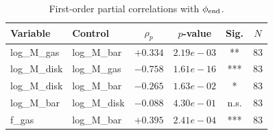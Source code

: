 \begin{table}[htbp]
\centering
\caption{First-order partial correlations with $\phi_{\rm end}$.}
\label{tab:partials}
\begin{tabular}{llcccc}
\hline
Variable & Control & $\rho_p$ & $p$-value & Sig. & $N$ \\
\hline
log\_M\_gas & log\_M\_bar & $+0.334$ & $2.19e-03$ & ** & 83 \\
log\_M\_disk & log\_M\_gas & $-0.758$ & $1.61e-16$ & *** & 83 \\
log\_M\_disk & log\_M\_bar & $-0.265$ & $1.63e-02$ & * & 83 \\
log\_M\_bar & log\_M\_disk & $-0.088$ & $4.30e-01$ & n.s. & 83 \\
f\_gas & log\_M\_bar & $+0.395$ & $2.41e-04$ & *** & 83 \\
\hline
\end{tabular}
\end{table}

